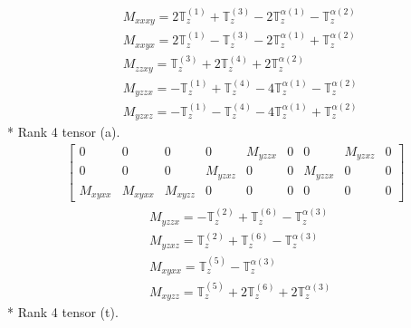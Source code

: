 \documentclass[fleqn,8pt,landscape]{jsarticle}
\begin{document}
\begin{align*}
& M_{xxxy} = 2 \mathbb{T}_{z}^{(1)} + \mathbb{T}_{z}^{(3)} - 2 \mathbb{T}_{z}^{\alpha(1)} - \mathbb{T}_{z}^{\alpha(2)} \\
& M_{xxyx} = 2 \mathbb{T}_{z}^{(1)} - \mathbb{T}_{z}^{(3)} - 2 \mathbb{T}_{z}^{\alpha(1)} + \mathbb{T}_{z}^{\alpha(2)} \\
& M_{zzxy} = \mathbb{T}_{z}^{(3)} + 2 \mathbb{T}_{z}^{(4)} + 2 \mathbb{T}_{z}^{\alpha(2)} \\
& M_{yzzx} = - \mathbb{T}_{z}^{(1)} + \mathbb{T}_{z}^{(4)} - 4 \mathbb{T}_{z}^{\alpha(1)} - \mathbb{T}_{z}^{\alpha(2)} \\
& M_{yzxz} = - \mathbb{T}_{z}^{(1)} - \mathbb{T}_{z}^{(4)} - 4 \mathbb{T}_{z}^{\alpha(1)} + \mathbb{T}_{z}^{\alpha(2)}
\end{align*}
* Rank 4 tensor (a).
\begin{align*}
\begin{bmatrix} 0 & 0 & 0 & 0 & M_{yzzx} & 0 & 0 & M_{yzxz} & 0 \\ 0 & 0 & 0 & M_{yzxz} & 0 & 0 & M_{yzzx} & 0 & 0 \\ M_{xyxx} & M_{xyxx} & M_{xyzz} & 0 & 0 & 0 & 0 & 0 & 0 \end{bmatrix}
\end{align*}
\begin{align*}
& M_{yzzx} = - \mathbb{T}_{z}^{(2)} + \mathbb{T}_{z}^{(6)} - \mathbb{T}_{z}^{\alpha(3)} \\
& M_{yzxz} = \mathbb{T}_{z}^{(2)} + \mathbb{T}_{z}^{(6)} - \mathbb{T}_{z}^{\alpha(3)} \\
& M_{xyxx} = \mathbb{T}_{z}^{(5)} - \mathbb{T}_{z}^{\alpha(3)} \\
& M_{xyzz} = \mathbb{T}_{z}^{(5)} + 2 \mathbb{T}_{z}^{(6)} + 2 \mathbb{T}_{z}^{\alpha(3)}
\end{align*}
* Rank 4 tensor (t).
\end{document}

